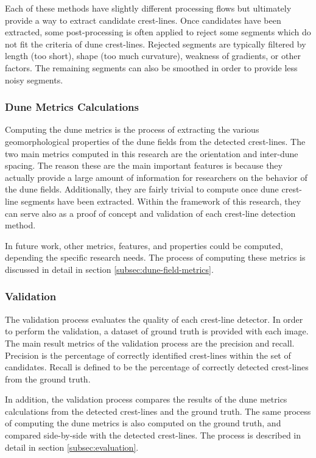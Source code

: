 Each of these methods have slightly different processing flows but ultimately provide a way to extract candidate crest-lines. Once candidates have been extracted, some post-processing is often applied to reject some segments which do not fit the criteria of dune crest-lines. Rejected segments are typically filtered by length (too short), shape (too much curvature), weakness of gradients, or other factors. The remaining segments can also be smoothed in order to provide less noisy segments.

\subsubsection*{Dune Metrics Calculations}
Computing the dune metrics is the process of extracting the various geomorphological properties of the dune fields from the detected crest-lines. The two main metrics computed in this research are the orientation and inter-dune spacing. The reason these are the main important features is because they actually provide a large amount of information for researchers on the behavior of the dune fields. Additionally, they are fairly trivial to compute once dune crest-line segments have been extracted. Within the framework of this research, they can serve also as a proof of concept and validation of each crest-line detection method. 

In future work, other metrics, features, and properties could be computed, depending the specific research needs. The process of computing these metrics is discussed in detail in section \ref{subsec:dune-field-metrics}.

\subsubsection*{Validation}
The validation process evaluates the quality of each crest-line detector. In order to perform the validation, a dataset of ground truth is provided with each image. The main result metrics of the validation process are the precision and recall. Precision is the percentage of correctly identified crest-lines within the set of candidates. Recall is defined to be the percentage of correctly detected crest-lines from the ground truth. 

In addition, the validation process compares the results of the dune metrics calculations from the detected crest-lines and the ground truth. The same process of computing the dune metrics is also computed on the ground truth, and compared side-by-side with the detected crest-lines. The process is described in detail in section \ref{subsec:evaluation}.

